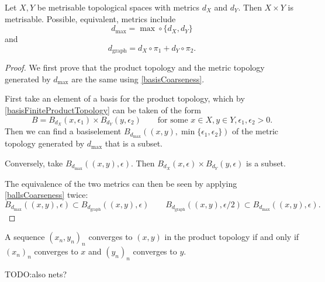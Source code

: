 \begin{proposition}
Let $X,Y$ be metrisable topological spaces with metrics $d_X$ and $d_Y$. Then $X\times Y$ is metrisable. Possible, equivalent, metrics include
\[ d_\text{max} = \max\circ \{d_X, d_Y\} \]
and
\[ d_\text{graph} = d_X \circ \pi_1 + d_Y \circ \pi_2. \]
\end{proposition}
\begin{proof}
We first prove that the product topology and the metric topology generated by $d_\text{max}$ are the same using \ref{basisCoarseness}.

First take an element of a basis for the product topology, which by \ref{basisFiniteProductTopology} can be taken of the form
\[ B = B_{d_X}(x, \epsilon_1)\times B_{d_Y}(y, \epsilon_2) \qquad \text{for some $x\in X, y\in Y, \epsilon_1,\epsilon_2 >0$.} \]
Then we can find a basiselement $B_{d_\text{max}}((x,y), \min\{\epsilon_1,\epsilon_2\})$ of the metric topology generated by $d_\text{max}$ that is a subset.

Conversely, take $B_{d_\text{max}}((x,y), \epsilon)$. Then $B_{d_X}(x, \epsilon)\times B_{d_Y}(y, \epsilon)$ is a subset.

The equivalence of the two metrics can then be seen by applying \ref{ballsCoarseness} twice:
\[ B_{d_\text{max}}((x,y), \epsilon) \subset B_{d_\text{graph}}((x,y), \epsilon) \qquad B_{d_\text{graph}}((x,y), \epsilon/2) \subset B_{d_\text{max}}((x,y), \epsilon). \]
\end{proof}
\begin{corollary} \label{convergenceFiniteProductTopology}
A sequence $(x_n,y_n)_n$ converges to $(x,y)$ in the product topology \textup{if and only if} $(x_n)_n$ converges to $x$ and $(y_n)_n$ converges to $y$.
\end{corollary}
TODO:also nets?

